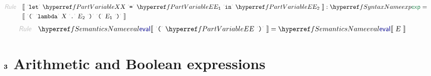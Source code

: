 \begin{align*}
  \KEY{Rule} \quad
    & \LEFTPHRASE \
        \LEX{let} \ \VARREF{X} \ \LEX{{=}} \ \VARREF{E}\SUB{1} \ \LEX{in} \ \VARREF{E}\SUB{2} \
      \RIGHTPHRASE : \SYNREF{exp} = \\&
      \LEFTPHRASE \
        \LEX{{(}} \ \LEX{lambda} \ \VAR{X} \ \LEX{{.}} \ \VAR{E}\SUB{2} \ \LEX{{)}} \ \LEX{{(}} \ \VAR{E}\SUB{1} \ \LEX{{)}} \
      \RIGHTPHRASE
\end{align*}
\begin{align*}
  \KEY{Rule} \quad
    & \SEMREF{eval} \LEFTPHRASE \
                            \LEX{{(}} \ \VARREF{E} \ \LEX{{)}} \
                          \RIGHTPHRASE  = 
      \SEMREF{eval} \LEFTPHRASE \
                            \VAR{E} \
                          \RIGHTPHRASE 
\end{align*}
\section{$\SECT{3}$ Arithmetic and Boolean expressions}\hypertarget{SectionNumber:3}{}\label{SectionNumber:3}

